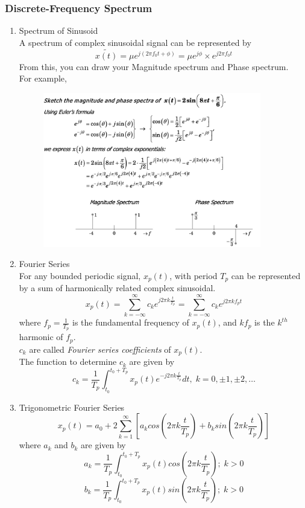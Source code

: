 \subsubsection{Discrete-Frequency Spectrum}
\begin{enumerate}
    \item Spectrum of Sinusoid \\
    A spectrum of complex sinusoidal signal can be represented by 
    \[ \tilde{x(t)} = \mu e^{j(2\pi f_0t + \phi)} = \mu e^{j\phi}\times e^{j2\pi f_0 t}\]
    From this, you can draw your Magnitude spectrum and Phase spectrum. \\
    For example, 
    \begin{figure}[h]
        \centering
        \includegraphics[width=0.9\textwidth]{image/magnitude_example.jpg}
        \label{fig:enter-label}
    \end{figure}
    \item Fourier Series \\
    For any bounded periodic signal, $x_p(t)$, with period $T_p$ can be represented by a sum of harmonically related complex sinusoidal.
    \begin{equation}
        x_p(t) = \sum^{\infty}_{k=-\infty}c_k e^{j2\pi k \frac{t}{T_p}} = \sum^{\infty}_{k=-\infty}c_k e^{j2\pi kf_p t}
    \end{equation}
    where $f_p = \frac{1}{T_p}$ is the fundamental frequency of $x_p(t)$, and $kf_p$ is the $k^{th}$ harmonic of $f_p$. \\
    $c_k$ are called \textit{Fourier series coefficients} of $x_p(t)$. \\
    The function to determine $c_k$ are given by
    \begin{equation}
        c_k = \frac{1}{T_p}\int^{t_0+T_p}_{t_0}x_p(t)e^{-j2\pi k \frac{t}{T_p}}dt, \; k=0,\pm1, \pm2, \dots
    \end{equation}
    \item Trigonometric Fourier Series
    \begin{equation}
        x_p(t) = a_0 + 2\sum^{\infty}_{k=1}[a_k cos(2\pi k \frac{t}{T_p})+b_ksin(2\pi k \frac{t}{T_p})]
    \end{equation}
    where $a_k$ and $b_k$ are given by
    \[a_k = \frac{1}{T_p}\int^{t_0+T_p}_{t_0}x_p(t)cos(2\pi k \frac{t}{T_p}); \; k > 0\]
    \[b_k = \frac{1}{T_p}\int^{t_0+T_p}_{t_0}x_p(t)sin(2\pi k \frac{t}{T_p}); \; k > 0\]
\end{enumerate}
